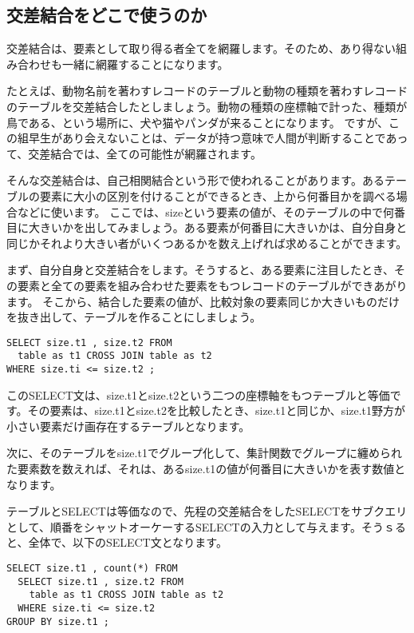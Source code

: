 \subsection{交差結合をどこで使うのか}

交差結合は、要素として取り得る者全てを網羅します。そのため、あり得ない組み合わせも一緒に網羅することになります。

たとえば、動物名前を著わすレコードのテーブルと動物の種類を著わすレコードのテーブルを交差結合したとしましょう。動物の種類の座標軸で計った、種類が鳥である、という場所に、犬や猫やパンダが来ることになります。
ですが、この組早生があり会えないことは、データが持つ意味で人間が判断することであって、交差結合では、全ての可能性が網羅されます。

そんな交差結合は、自己相関結合という形で使われることがあります。あるテーブルの要素に大小の区別を付けることができるとき、上から何番目かを調べる場合などに使います。
ここでは、sizeという要素の値が、そのテーブルの中で何番目に大きいかを出してみましょう。ある要素が何番目に大きいかは、自分自身と同じかそれより大きい者がいくつあるかを数え上げれば求めることができます。

まず、自分自身と交差結合をします。そうすると、ある要素に注目したとき、その要素と全ての要素を組み合わせた要素をもつレコードのテーブルができあがります。
そこから、結合した要素の値が、比較対象の要素同じか大きいものだけを抜き出して、テーブルを作ることにしましょう。

\begin{verbatim}
SELECT size.t1 , size.t2 FROM
  table as t1 CROSS JOIN table as t2
WHERE size.ti <= size.t2 ;
\end{verbatim}

このSELECT文は、size.t1とsize.t2という二つの座標軸をもつテーブルと等価です。その要素は、size.t1とsize.t2を比較したとき、size.t1と同じか、size.t1野方が小さい要素だけ画存在するテーブルとなります。

次に、そのテーブルをsize.t1でグループ化して、集計関数でグループに纏められた要素数を数えれば、それは、あるsize.t1の値が何番目に大きいかを表す数値となります。

テーブルとSELECTは等価なので、先程の交差結合をしたSELECTをサブクエリとして、順番をシャットオーケーするSELECTの入力として与えます。そうｓると、全体で、以下のSELECT文となります。

\begin{verbatim}
SELECT size.t1 , count(*) FROM
  SELECT size.t1 , size.t2 FROM
    table as t1 CROSS JOIN table as t2
  WHERE size.ti <= size.t2
GROUP BY size.t1 ;
\end{verbatim}

